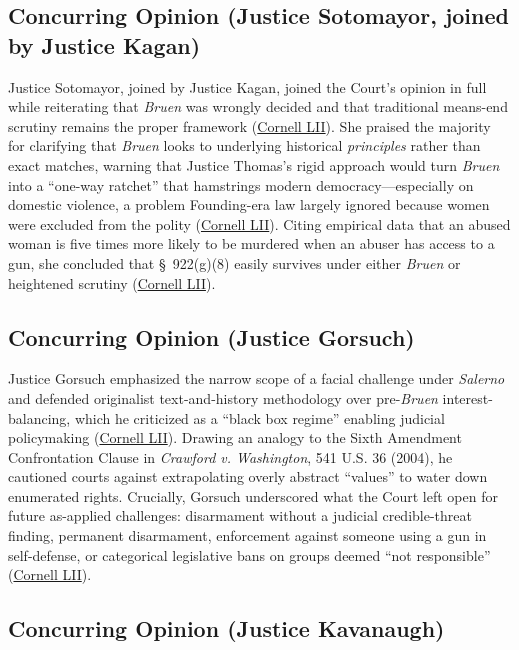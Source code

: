 \documentclass[12pt]{article}
\begin{document}
\subsection{Concurring Opinion (Justice Sotomayor, joined by Justice Kagan)}

Justice Sotomayor, joined by Justice Kagan, joined the Court's opinion in full while reiterating that \textit{Bruen} was wrongly decided and that traditional means-end scrutiny remains the proper framework (\href{https://www.law.cornell.edu/supremecourt/text/22-915}{Cornell LII}). She praised the majority for clarifying that \textit{Bruen} looks to underlying historical \textit{principles} rather than exact matches, warning that Justice Thomas's rigid approach would turn \textit{Bruen} into a ``one-way ratchet'' that hamstrings modern democracy---especially on domestic violence, a problem Founding-era law largely ignored because women were excluded from the polity (\href{https://www.law.cornell.edu/supremecourt/text/22-915}{Cornell LII}). Citing empirical data that an abused woman is five times more likely to be murdered when an abuser has access to a gun, she concluded that \S\ 922(g)(8) easily survives under either \textit{Bruen} or heightened scrutiny (\href{https://www.law.cornell.edu/supremecourt/text/22-915}{Cornell LII}).

\subsection{Concurring Opinion (Justice Gorsuch)}

Justice Gorsuch emphasized the narrow scope of a facial challenge under \textit{Salerno} and defended originalist text-and-history methodology over pre-\textit{Bruen} interest-balancing, which he criticized as a ``black box regime'' enabling judicial policymaking (\href{https://www.law.cornell.edu/supremecourt/text/22-915}{Cornell LII}). Drawing an analogy to the Sixth Amendment Confrontation Clause in \textit{Crawford v. Washington}, 541 U.S. 36 (2004), he cautioned courts against extrapolating overly abstract ``values'' to water down enumerated rights. Crucially, Gorsuch underscored what the Court left open for future as-applied challenges: disarmament without a judicial credible-threat finding, permanent disarmament, enforcement against someone using a gun in self-defense, or categorical legislative bans on groups deemed ``not responsible'' (\href{https://www.law.cornell.edu/supremecourt/text/22-915}{Cornell LII}).

\subsection{Concurring Opinion (Justice Kavanaugh)}
\end{document}
